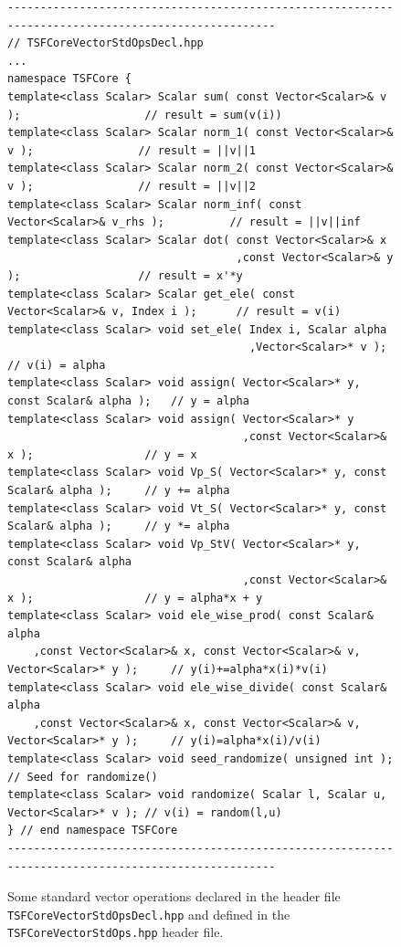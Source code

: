 {\bsinglespace
\begin{figure}[t]
\begin{minipage}{\textwidth}
{\scriptsize\begin{verbatim}
----------------------------------------------------------------------------------------------------
// TSFCoreVectorStdOpsDecl.hpp
...
namespace TSFCore {
template<class Scalar> Scalar sum( const Vector<Scalar>& v );                   // result = sum(v(i))
template<class Scalar> Scalar norm_1( const Vector<Scalar>& v );                // result = ||v||1
template<class Scalar> Scalar norm_2( const Vector<Scalar>& v );                // result = ||v||2
template<class Scalar> Scalar norm_inf( const Vector<Scalar>& v_rhs );          // result = ||v||inf
template<class Scalar> Scalar dot( const Vector<Scalar>& x
                                   ,const Vector<Scalar>& y );                  // result = x'*y
template<class Scalar> Scalar get_ele( const Vector<Scalar>& v, Index i );      // result = v(i)
template<class Scalar> void set_ele( Index i, Scalar alpha
                                     ,Vector<Scalar>* v );                      // v(i) = alpha
template<class Scalar> void assign( Vector<Scalar>* y, const Scalar& alpha );   // y = alpha
template<class Scalar> void assign( Vector<Scalar>* y
                                    ,const Vector<Scalar>& x );                 // y = x
template<class Scalar> void Vp_S( Vector<Scalar>* y, const Scalar& alpha );     // y += alpha
template<class Scalar> void Vt_S( Vector<Scalar>* y, const Scalar& alpha );     // y *= alpha
template<class Scalar> void Vp_StV( Vector<Scalar>* y, const Scalar& alpha
                                    ,const Vector<Scalar>& x );                 // y = alpha*x + y
template<class Scalar> void ele_wise_prod( const Scalar& alpha
    ,const Vector<Scalar>& x, const Vector<Scalar>& v, Vector<Scalar>* y );     // y(i)+=alpha*x(i)*v(i)
template<class Scalar> void ele_wise_divide( const Scalar& alpha
    ,const Vector<Scalar>& x, const Vector<Scalar>& v, Vector<Scalar>* y );     // y(i)=alpha*x(i)/v(i)
template<class Scalar> void seed_randomize( unsigned int );                     // Seed for randomize()
template<class Scalar> void randomize( Scalar l, Scalar u, Vector<Scalar>* v ); // v(i) = random(l,u)
} // end namespace TSFCore
----------------------------------------------------------------------------------------------------
\end{verbatim}}
\end{minipage}
\caption{
\label{tsfcore:fig:std_vec_ops}
Some standard vector operations declared in the header file
{}\texttt{TSFCore\-Vector\-Std\-Ops\-Decl.hpp} and defined in the
{}\texttt{TSFCore\-Vector\-Std\-Ops.hpp} header file. 
}
\end{figure}
\esinglespace}

